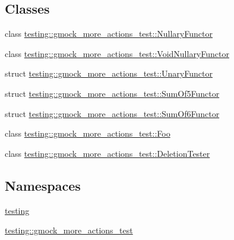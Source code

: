 \subsection*{Classes}
\begin{DoxyCompactItemize}
\item 
class \hyperlink{classtesting_1_1gmock__more__actions__test_1_1_nullary_functor}{testing\+::gmock\+\_\+more\+\_\+actions\+\_\+test\+::\+Nullary\+Functor}
\item 
class \hyperlink{classtesting_1_1gmock__more__actions__test_1_1_void_nullary_functor}{testing\+::gmock\+\_\+more\+\_\+actions\+\_\+test\+::\+Void\+Nullary\+Functor}
\item 
struct \hyperlink{structtesting_1_1gmock__more__actions__test_1_1_unary_functor}{testing\+::gmock\+\_\+more\+\_\+actions\+\_\+test\+::\+Unary\+Functor}
\item 
struct \hyperlink{structtesting_1_1gmock__more__actions__test_1_1_sum_of5_functor}{testing\+::gmock\+\_\+more\+\_\+actions\+\_\+test\+::\+Sum\+Of5\+Functor}
\item 
struct \hyperlink{structtesting_1_1gmock__more__actions__test_1_1_sum_of6_functor}{testing\+::gmock\+\_\+more\+\_\+actions\+\_\+test\+::\+Sum\+Of6\+Functor}
\item 
class \hyperlink{classtesting_1_1gmock__more__actions__test_1_1_foo}{testing\+::gmock\+\_\+more\+\_\+actions\+\_\+test\+::\+Foo}
\item 
class \hyperlink{classtesting_1_1gmock__more__actions__test_1_1_deletion_tester}{testing\+::gmock\+\_\+more\+\_\+actions\+\_\+test\+::\+Deletion\+Tester}
\end{DoxyCompactItemize}
\subsection*{Namespaces}
\begin{DoxyCompactItemize}
\item 
 \hyperlink{namespacetesting}{testing}
\item 
 \hyperlink{namespacetesting_1_1gmock__more__actions__test}{testing\+::gmock\+\_\+more\+\_\+actions\+\_\+test}
\end{DoxyCompactItemize}
